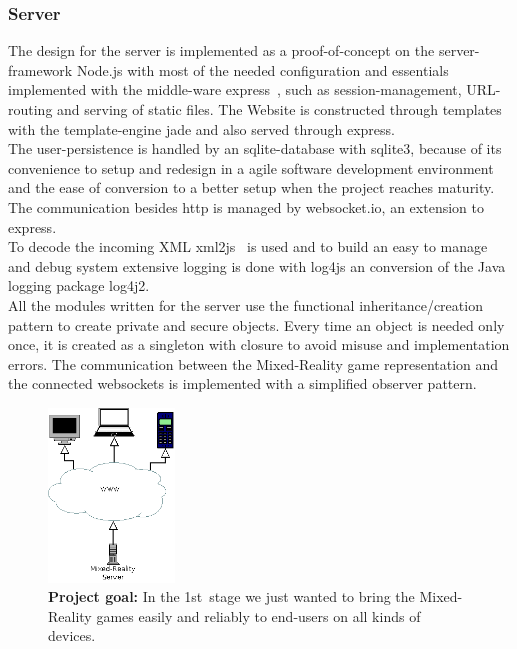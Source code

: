 \documentclass[journal]{IEEEtran}
\begin{document}
\subsubsection{Server}
The design for the server is implemented as a proof-of-concept on the
server-framework Node.js\cite{Node.js} with most of the needed configuration and
essentials implemented with the middle-ware express~\cite{express}, such as
session-management, URL-routing and serving of static files. The Website is
constructed through templates with the template-engine jade\cite{jade} and also served through express.\\
The user-persistence is handled by an sqlite-database with
sqlite3\cite{sqlite3}, because of its convenience to setup and redesign in a
agile software development environment\cite{agile_devel} and the ease of
conversion to a better setup when the project reaches maturity.\\
The communication besides http is managed by
websocket.io\cite{websocket.io}\cite{smash_node.js}, an extension to express.\\
To decode the incoming XML xml2js~\cite{xml2js} is used and to build an easy to
manage and debug system extensive logging is done with log4js\cite{log4js} an
conversion of the Java logging package log4j2\cite{log4j2}.\\
All the modules written for the server use the functional inheritance/creation
pattern\cite{js_goodparts} to create private and secure objects. Every time an
object is needed only once, it is created as a singleton with
closure\cite{js_designpattern} to avoid misuse and implementation errors. The
communication between the Mixed-Reality game representation and the connected
websockets is implemented with a simplified observer
pattern\cite{js_designpattern}.\\[3mm]
\begin{figure}[!t]
    \centering
    \includegraphics[width=0.3\textwidth]{project-target.png}
    \caption{\textbf{Project goal:} In the 1st~stage we just wanted to bring the Mixed-Reality games easily and reliably to end-users on all kinds of devices.}
    \label{fig:proj_goal}
\end{figure}
\end{document}
